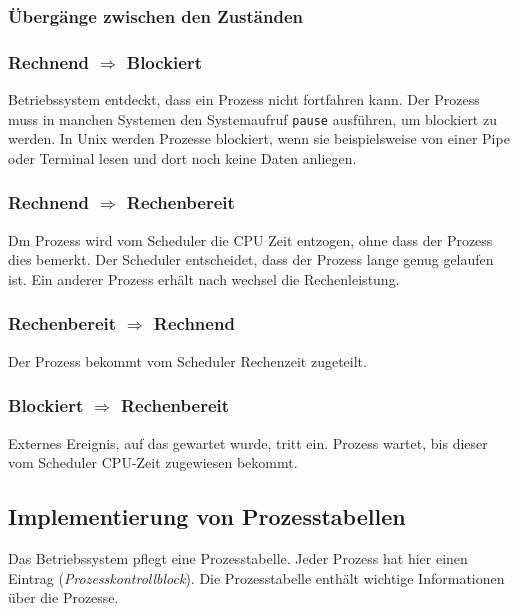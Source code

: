 \subsubsection{Übergänge zwischen den Zuständen}

\subsubsection*{Rechnend $\Rightarrow$ Blockiert}

Betriebssystem entdeckt, dass ein Prozess nicht fortfahren kann. Der Prozess muss in manchen Systemen den Systemaufruf \texttt{pause} ausführen, um blockiert zu werden. In Unix werden Prozesse blockiert, wenn sie beispielsweise von einer Pipe oder Terminal lesen und dort noch keine Daten anliegen.

\subsubsection*{Rechnend $\Rightarrow$ Rechenbereit}

Dm Prozess wird vom Scheduler die CPU Zeit entzogen, ohne dass der Prozess dies bemerkt. Der Scheduler entscheidet, dass der Prozess lange genug gelaufen ist. Ein anderer Prozess erhält nach wechsel die Rechenleistung.

\subsubsection*{Rechenbereit $\Rightarrow$ Rechnend}

Der Prozess bekommt vom Scheduler Rechenzeit zugeteilt.

\subsubsection*{Blockiert $\Rightarrow$ Rechenbereit}

Externes Ereignis, auf das gewartet wurde, tritt ein. Prozess wartet, bis dieser vom Scheduler CPU-Zeit zugewiesen bekommt.

\subsection{Implementierung von Prozesstabellen}

Das Betriebssystem pflegt eine Prozesstabelle. Jeder Prozess hat hier einen Eintrag (\textit{Prozesskontrollblock}). Die Prozesstabelle enthält wichtige Informationen über die Prozesse.

